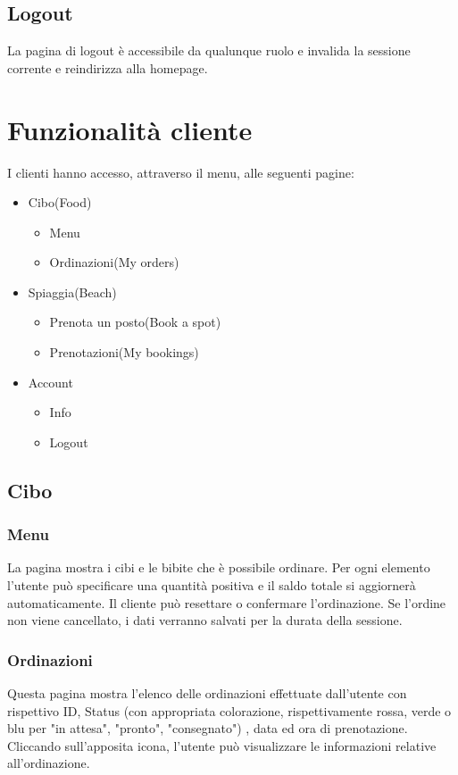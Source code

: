 \documentclass{article}
\begin{document}
\subsection{Logout}
La pagina di logout è accessibile da qualunque ruolo e invalida la sessione corrente e reindirizza alla homepage.

\section{Funzionalità cliente}
I clienti hanno accesso, attraverso il menu, alle seguenti pagine:
\begin{itemize}
	\item Cibo(Food)
	\begin{itemize}
		\item Menu
		\item Ordinazioni(My orders)
	\end{itemize}
	\item Spiaggia(Beach)
	\begin{itemize}
		\item Prenota un posto(Book a spot)
		\item Prenotazioni(My bookings)
	\end{itemize}
	\item Account
	\begin{itemize}
		\item Info
		\item Logout
	\end{itemize}
\end{itemize}
\subsection{Cibo}
\subsubsection{Menu}
La pagina mostra i cibi e le bibite che è possibile ordinare. Per ogni elemento l'utente può specificare una quantità positiva e il saldo totale si aggiornerà automaticamente. Il cliente può resettare o confermare l'ordinazione. Se l'ordine non viene cancellato, i dati verranno salvati per la durata della sessione.
\subsubsection{Ordinazioni}
Questa pagina mostra l'elenco delle ordinazioni effettuate dall'utente con rispettivo ID, Status (con appropriata colorazione, rispettivamente rossa, verde o blu per "in attesa", "pronto", "consegnato") , data ed ora di prenotazione. Cliccando sull'apposita icona, l'utente può visualizzare le informazioni relative all'ordinazione.
\end{document}
